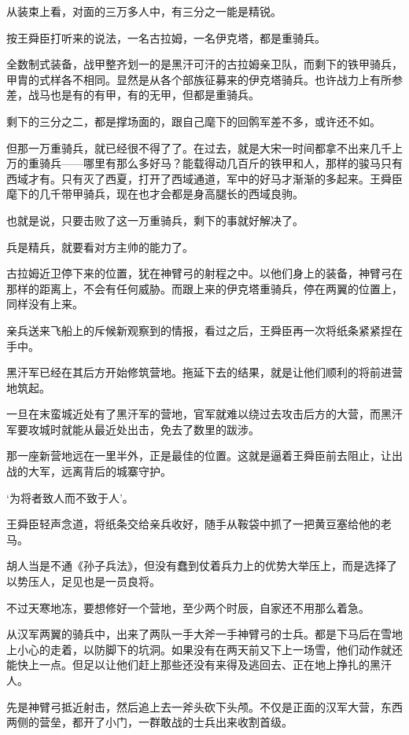从装束上看，对面的三万多人中，有三分之一能是精锐。

按王舜臣打听来的说法，一名古拉姆，一名伊克塔，都是重骑兵。

全数制式装备，战甲整齐划一的是黑汗可汗的古拉姆亲卫队，而剩下的铁甲骑兵，甲胄的式样各不相同。显然是从各个部族征募来的伊克塔骑兵。也许战力上有所参差，战马也是有的有甲，有的无甲，但都是重骑兵。

剩下的三分之二，都是撑场面的，跟自己麾下的回鹘军差不多，或许还不如。

但那一万重骑兵，就已经很不得了了。在过去，就是大宋一时间都拿不出来几千上万的重骑兵——哪里有那么多好马？能载得动几百斤的铁甲和人，那样的骏马只有西域才有。只有灭了西夏，打开了西域通道，军中的好马才渐渐的多起来。王舜臣麾下的几千带甲骑兵，现在也才会都是身高腿长的西域良驹。

也就是说，只要击败了这一万重骑兵，剩下的事就好解决了。

兵是精兵，就要看对方主帅的能力了。

古拉姆近卫停下来的位置，犹在神臂弓的射程之中。以他们身上的装备，神臂弓在那样的距离上，不会有任何威胁。而跟上来的伊克塔重骑兵，停在两翼的位置上，同样没有上来。

亲兵送来飞船上的斥候新观察到的情报，看过之后，王舜臣再一次将纸条紧紧捏在手中。

黑汗军已经在其后方开始修筑营地。拖延下去的结果，就是让他们顺利的将前进营地筑起。

一旦在末蛮城近处有了黑汗军的营地，官军就难以绕过去攻击后方的大营，而黑汗军要攻城时就能从最近处出击，免去了数里的跋涉。

那一座新营地远在一里半外，正是最佳的位置。这就是逼着王舜臣前去阻止，让出战的大军，远离背后的城寨守护。

‘为将者致人而不致于人’。

王舜臣轻声念道，将纸条交给亲兵收好，随手从鞍袋中抓了一把黄豆塞给他的老马。

胡人当是不通《孙子兵法》，但没有蠢到仗着兵力上的优势大举压上，而是选择了以势压人，足见也是一员良将。

不过天寒地冻，要想修好一个营地，至少两个时辰，自家还不用那么着急。

从汉军两翼的骑兵中，出来了两队一手大斧一手神臂弓的士兵。都是下马后在雪地上小心的走着，以防脚下的坑洞。如果没有在两天前又下上一场雪，他们动作就还能快上一点。但足以让他们赶上那些还没有来得及逃回去、正在地上挣扎的黑汗人。

先是神臂弓抵近射击，然后追上去一斧头砍下头颅。不仅是正面的汉军大营，东西两侧的营垒，都开了小门，一群敢战的士兵出来收割首级。

